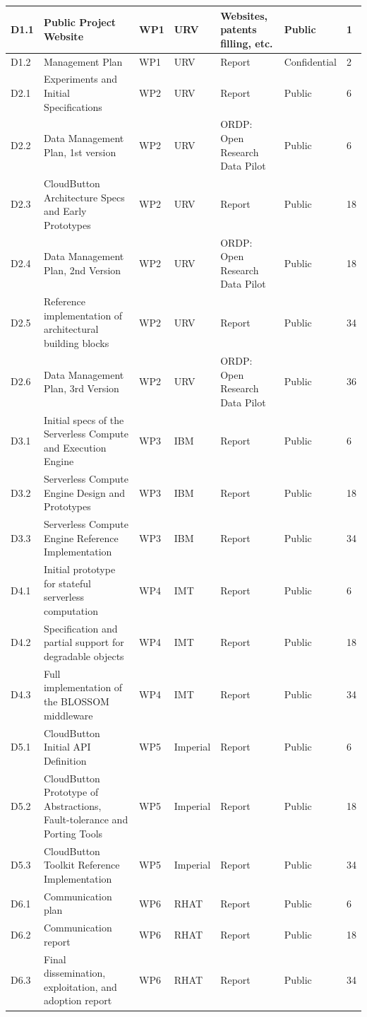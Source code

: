 \documentclass[a4paper,11pt]{article}
\begin{document}
\begin{appendices}
{\begin{center}
\begin{longtable}{ |p{1.0cm} | p{4.5cm} | p{1.5cm} | p{1.5cm}  | p{2cm}  | p{2.3cm}  | p{1.3cm} | }
D1.1 & Public Project Website & WP1 & URV & Websites, patents filling, etc. & Public & 1 \\ \hline
D1.2 & Management Plan & WP1 & URV & Report & Confidential & 2 \\ \hline
D2.1 & Experiments and Initial Specifications & WP2 &  URV & Report & Public & 6 \\ \hline
D2.2 & Data Management Plan, 1st version & WP2 & URV & ORDP: Open Research Data Pilot & Public & 6 \\ \hline
D2.3 & CloudButton Architecture Specs and Early Prototypes & WP2 & URV & Report & Public & 18 \\ \hline
D2.4 & Data Management Plan, 2nd Version & WP2 & URV & ORDP: Open Research Data Pilot & Public & 18 \\ \hline
D2.5 & Reference implementation of architectural building blocks & WP2 & URV & Report & Public & 34 \\ \hline
D2.6 & Data Management Plan, 3rd Version & WP2 & URV & ORDP: Open Research Data Pilot & Public & 36 \\ \hline
D3.1 & Initial specs of the Serverless Compute and Execution Engine & WP3 & IBM & Report & Public & 6 \\ \hline
D3.2 & Serverless Compute Engine Design and Prototypes & WP3 & IBM & Report & Public & 18 \\ \hline
D3.3 & Serverless Compute Engine Reference Implementation & WP3 & IBM & Report & Public & 34 \\ \hline
D4.1 & Initial prototype for stateful serverless computation & WP4 & IMT & Report & Public & 6 \\ \hline
D4.2 & Specification and partial support for degradable objects & WP4 & IMT & Report & Public & 18 \\ \hline
D4.3 & Full implementation of the BLOSSOM middleware & WP4 & IMT & Report & Public & 34 \\ \hline
D5.1 & CloudButton Initial API Definition & WP5 & Imperial & Report & Public & 6 \\ \hline
D5.2 & CloudButton Prototype of Abstractions, Fault-tolerance and Porting Tools & WP5 & Imperial & Report & Public & 18 \\ \hline
D5.3 & CloudButton Toolkit Reference Implementation & WP5 & Imperial & Report & Public & 34 \\ \hline
D6.1 & Communication plan & WP6 & RHAT & Report & Public & 6 \\ \hline
D6.2 & Communication report & WP6 & RHAT & Report & Public & 18 \\ \hline
D6.3 & Final dissemination, exploitation, and adoption report & WP6 & RHAT & Report & Public & 34 \\ \hline

\end{longtable}
\end{center}
}

\end{appendices}
\end{document}
